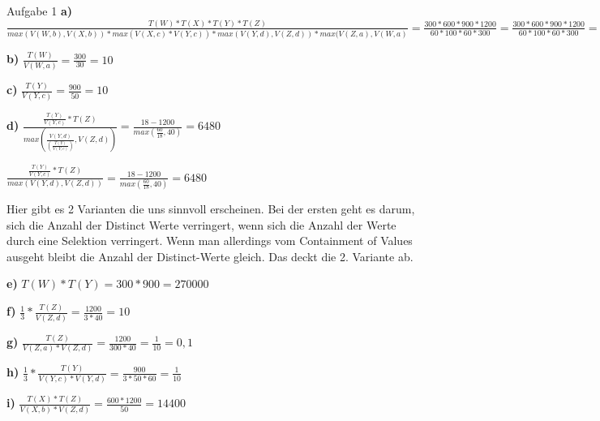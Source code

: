 \documentclass[12pt]{article}
\begin{document}
\begin{section}{Aufgabe 1}
\textbf{a)} 
$\frac{T(W) * T(X) * T(Y) * T(Z)}{max( V(W,b), V(X,b) ) * max( V(X,c) * V(Y,c)) * max( V(Y,d), V(Z,d)) * max(V(Z,a),V(W,a)} = 
\frac{300 * 600 * 900 * 1200}{60 * 100 * 60 * 300} = \frac{300 * 600 * 900 * 1200}{60 * 100 * 60 * 300} =  \frac{300 * 900 * 1200}{600*300} = 1800$

\noindent \textbf{b)}
$\frac{T(W)}{V(W,a)}  = \frac{300}{30} = 10$

\noindent \textbf{c)}
$\frac{T(Y)}{V(Y,c)}  = \frac{900}{50} = 10$


\noindent \textbf{d)}
$\frac{\frac{T(Y)}{V(Y,c)} * T(Z)}{max( \frac{V(Y,d)}{(\frac{T(Y)}{V(Y,c)})},V(Z,d))}  = \frac{18-1200}{max(\frac{60}{18},40)} = 6480 $

$\frac{\frac{T(Y)}{V(Y,c)} * T(Z)}{max( V(Y,d), V(Z,d)) }  = \frac{18-1200}{max(\frac{60}{18},40)} = 6480 $

Hier gibt es 2 Varianten die uns sinnvoll erscheinen. Bei der ersten geht es darum, sich die Anzahl der Distinct Werte verringert, wenn sich die Anzahl der Werte durch eine Selektion verringert. Wenn man allerdings vom Containment of Values ausgeht bleibt die Anzahl der Distinct-Werte gleich. Das deckt die 2. Variante ab.

\noindent \textbf{e)}
$T(W)*T(Y) = 300 * 900 = 270000$

\noindent \textbf{f)}
$\frac{1}{3} * \frac{T(Z)}{V(Z,d)} = \frac{1200}{3*40}=10$

\noindent \textbf{g)}
$\frac{T(Z)}{V(Z,a)*V(Z,d)} = \frac{1200}{300*40} = \frac{1}{10} =0,1$

\noindent \textbf{h)}
$\frac{1}{3} * \frac{T(Y)}{V(Y,c)*V(Y,d)} = \frac{900}{3*50*60} = \frac{1}{10}$

\noindent \textbf{i)}
$\frac{T(X)*T(Z)}{V(X,b)*V(Z,d)} = \frac{600*1200}{50} = 14400$

\end{section}
\end{document}
